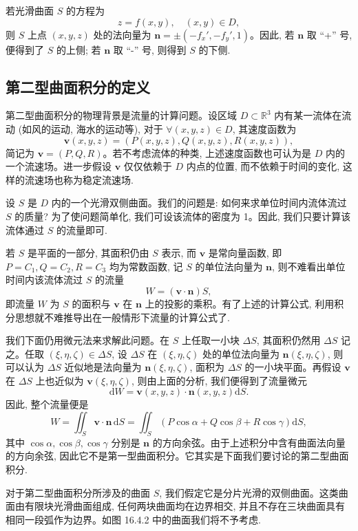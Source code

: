 若光滑曲面 $S$ 的方程为
\[
  z=f(x,y),\quad (x,y)\in D,
\]
则 $S$ 上点 $(x,y,z)$ 处的法向量为 $\boldsymbol n=\pm(-f_x',-f_y',1)$。因此, 若 $\boldsymbol n$ 取 ``+'' 号, 便得到了 $S$ 的上侧; 若 $\boldsymbol n$ 取 ``-'' 号, 则得到 $S$ 的下侧.

\subsection{第二型曲面积分的定义}
\label{subsec:ma-16-4-2}

第二型曲面积分的物理背景是流量的计算问题。设区域 $D\subset\mathbb R^3$ 内有某一流体在流动 (如风的运动, 海水的运动等), 对于 $\forall(x,y,z)\in D$, 其速度函数为
\[
  \boldsymbol v(x,y,z)=(P(x,y,z),Q(x,y,z),R(x,y,z)),
\]
简记为 $\boldsymbol v=(P,Q,R)$。若不考虑流体的种类, 上述速度函数也可认为是 $D$ 内的一个流速场。进一步假设 $\boldsymbol v$ 仅仅依赖于 $D$ 内点的位置, 而不依赖于时间的变化, 这样的流速场也称为稳定流速场.

设 $S$ 是 $D$ 内的一个光滑双侧曲面。我们的问题是: 如何来求单位时间内流体流过 $S$ 的质量? 为了使问题简单化, 我们可设该流体的密度为 1。因此, 我们只要计算该流体通过 $S$ 的流量即可.

若 $S$ 是平面的一部分, 其面积仍由 $S$ 表示, 而 $\boldsymbol v$ 是常向量函数, 即 $P=C_1,Q=C_2,R=C_3$ 均为常数函数, 记 $S$ 的单位法向量为 $\boldsymbol n$, 则不难看出单位时间内该流体流过 $S$ 的流量
\[
  W=(\boldsymbol v\cdot\boldsymbol n)S,
\]
即流量 $W$ 为 $S$ 的面积与 $\boldsymbol v$ 在 $\boldsymbol n$ 上的投影的乘积。有了上述的计算公式, 利用积分思想就不难推导出在一般情形下流量的计算公式了.

我们下面仍用微元法来求解此问题。在 $S$ 上任取一小块 $\Delta S$, 其面积仍然用 $\Delta S$ 记之。任取 $(\xi,\eta,\zeta)\in\Delta S$, 设 $\Delta S$ 在 $(\xi,\eta,\zeta)$ 处的单位法向量为 $\boldsymbol n(\xi,\eta,\zeta)$, 则可以认为 $\Delta S$ 近似地是法向量为 $\boldsymbol n(\xi,\eta,\zeta)$, 面积为 $\Delta S$ 的一小块平面。再假设 $\boldsymbol v$ 在 $\Delta S$ 上也近似为 $\boldsymbol v(\xi,\eta,\zeta)$, 则由上面的分析, 我们便得到了流量微元
\[
  \mathrm dW=\boldsymbol v(x,y,z)\cdot\boldsymbol n(x,y,z)\mathrm dS.
\]
因此, 整个流量便是
\[
  W=\iint_S\boldsymbol v\cdot\boldsymbol n\,\mathrm dS
  =\iint_S(P\cos\alpha+Q\cos\beta+R\cos\gamma)\mathrm dS,
\]
其中 $\cos\alpha,\cos\beta,\cos\gamma$ 分别是 $\boldsymbol n$ 的方向余弦。由于上述积分中含有曲面法向量的方向余弦, 因此它不是第一型曲面积分。它其实是下面我们要讨论的第二型曲面积分.

对于第二型曲面积分所涉及的曲面 $S$, 我们假定它是分片光滑的双侧曲面。这类曲面由有限块光滑曲面组成, 任何两块曲面均在边界相交, 并且不存在三块曲面具有相同一段弧作为边界。如图 16.4.2 中的曲面我们将不予考虑.

